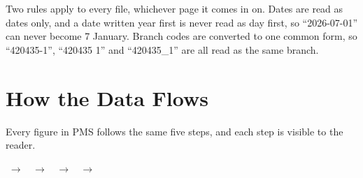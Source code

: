 \documentclass[11pt,a4paper]{article}
\newcommand{\qt}[1]{\textquotedblleft #1\textquotedblright}
\begin{document}
Two rules apply to every file, whichever page it comes in on. Dates are read as dates
only, and a date written year first is never read as day first, so \qt{2026-07-01} can
never become 7 January. Branch codes are converted to one common form, so
\qt{420435-1}, \qt{420435 1} and \qt{420435\_1} are all read as the same branch.

\section{How the Data Flows}

Every figure in PMS follows the same five steps, and each step is visible to the reader.

\vspace{4pt}
\begin{center}\small
{}$\;\rightarrow\;$%
$\;\rightarrow\;$%
$\;\rightarrow\;$%
$\;\rightarrow\;$%
\end{center}
\vspace{4pt}
\end{document}
